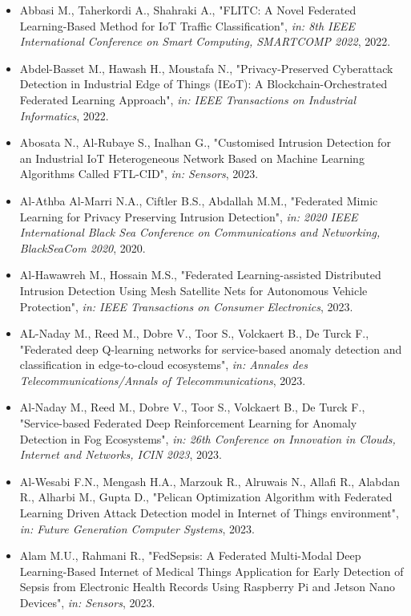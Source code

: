 \begin{itemize}
  \item Abbasi M., Taherkordi A., Shahraki A., "FLITC: A Novel Federated Learning-Based Method for IoT Traffic Classification", \textit{in: 8th IEEE International Conference on Smart Computing, SMARTCOMP 2022}, 2022.
  \item Abdel-Basset M., Hawash H., Moustafa N., "Privacy-Preserved Cyberattack Detection in Industrial Edge of Things (IEoT): A Blockchain-Orchestrated Federated Learning Approach", \textit{in: IEEE Transactions on Industrial Informatics}, 2022.
  \item Abosata N., Al-Rubaye S., Inalhan G., "Customised Intrusion Detection for an Industrial IoT Heterogeneous Network Based on Machine Learning Algorithms Called FTL-CID", \textit{in: Sensors}, 2023.
  \item Al-Athba Al-Marri N.A., Ciftler B.S., Abdallah M.M., "Federated Mimic Learning for Privacy Preserving Intrusion Detection", \textit{in: 2020 IEEE International Black Sea Conference on Communications and Networking, BlackSeaCom 2020}, 2020.
  \item Al-Hawawreh M., Hossain M.S., "Federated Learning-assisted Distributed Intrusion Detection Using Mesh Satellite Nets for Autonomous Vehicle Protection", \textit{in: IEEE Transactions on Consumer Electronics}, 2023.
  \item AL-Naday M., Reed M., Dobre V., Toor S., Volckaert B., De Turck F., "Federated deep Q-learning networks for service-based anomaly detection and classification in edge-to-cloud ecosystems", \textit{in: Annales des Telecommunications/Annals of Telecommunications}, 2023.
  \item Al-Naday M., Reed M., Dobre V., Toor S., Volckaert B., De Turck F., "Service-based Federated Deep Reinforcement Learning for Anomaly Detection in Fog Ecosystems", \textit{in: 26th Conference on Innovation in Clouds, Internet and Networks, ICIN 2023}, 2023.
  \item Al-Wesabi F.N., Mengash H.A., Marzouk R., Alruwais N., Allafi R., Alabdan R., Alharbi M., Gupta D., "Pelican Optimization Algorithm with Federated Learning Driven Attack Detection model in Internet of Things environment", \textit{in: Future Generation Computer Systems}, 2023.
  \item Alam M.U., Rahmani R., "FedSepsis: A Federated Multi-Modal Deep Learning-Based Internet of Medical Things Application for Early Detection of Sepsis from Electronic Health Records Using Raspberry Pi and Jetson Nano Devices", \textit{in: Sensors}, 2023.

\end{itemize}
